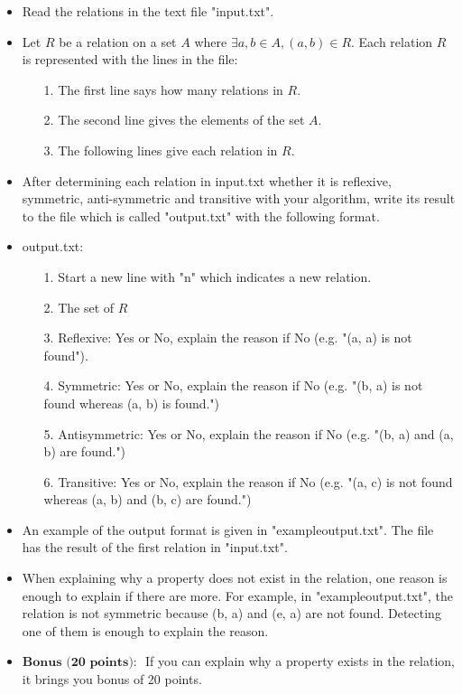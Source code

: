 \documentclass[a4 paper]{article}
\numberwithin{equation}{section}
\newcommand{\0}{\mathbf{0}}
\begin{document}
\begin{itemize}
	\item Read the relations in the text file "input.txt".
	\item Let $R$ be a relation on a set $A$ where $\exists a,b \in A, (a,b) \in R$. Each relation $R$ is represented with the lines in the file:
	\begin{itemize}
		\item [1.] The first line says how many relations in $R$.
		\item[2.] The second line gives the elements of the set $A$.
		\item[3.] The following lines give each relation in $R$.
	\end{itemize}
	\item After determining each relation in input.txt whether it is reflexive, symmetric, anti-symmetric and transitive with your algorithm, write its result to the file which is called "output.txt" with the following format.
	\item output.txt:
	\begin{itemize}
		\item[1.] Start a new line with "n" which indicates a new relation.
		\item[2.] The set of $R$
		\item[3.] Reflexive: Yes or No, explain the reason if No (e.g. "(a, a) is not found").
		\item[4.] Symmetric: Yes or No, explain the reason if No (e.g. "(b, a) is not found whereas (a, b) is found.")
		\item[5.] Antisymmetric: Yes or No, explain the reason if No (e.g. "(b, a) and (a, b) are found.")
		\item[6.] Transitive: Yes or No, explain the reason if No (e.g. "(a, c) is not found whereas (a, b) and (b, c) are found.")
	\end{itemize}
	\item An example of the output format is given in "exampleoutput.txt". The file has the result of the first relation in "input.txt".
	\item When explaining why a property does not exist in the relation, one reason is enough to explain if there are more. For example, in "exampleoutput.txt", the relation is not symmetric because (b, a) and (e, a) are not found. Detecting one of them is enough to explain the reason.
	\item $\textbf{Bonus (20 points): }$ If you can explain why a property exists in the relation, it brings you bonus of 20 points.

\end{itemize}
\end{document}
